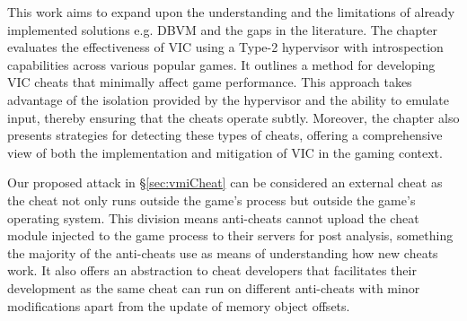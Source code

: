 This work aims to expand upon the understanding and the limitations of already implemented solutions e.g. DBVM and the gaps in the literature. The chapter evaluates the effectiveness of VIC using a Type-2 hypervisor with introspection capabilities across various popular games. It outlines a method for developing VIC cheats that minimally affect game performance. This approach takes advantage of the isolation provided by the hypervisor and the ability to emulate input, thereby ensuring that the cheats operate subtly. Moreover, the chapter also presents strategies for detecting these types of cheats, offering a comprehensive view of both the implementation and mitigation of VIC in the gaming context.



Our proposed attack in \S\ref{sec:vmiCheat} can be considered an external cheat as the cheat not only runs outside the game's process but outside the game's operating system. This division means anti-cheats cannot upload the cheat module injected to the game process to their servers for post analysis, something the majority of the anti-cheats use as means of understanding how new cheats work. It also offers an abstraction to cheat developers that facilitates their development as the same cheat can run on different anti-cheats with minor modifications apart from the update of memory object offsets. 